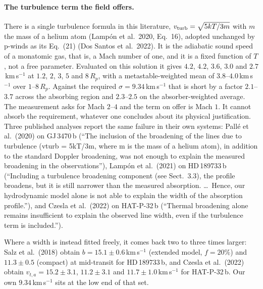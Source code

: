 \documentclass[english,a4paper]{my_memo}
\begin{document}
\paragraph{The turbulence term the field offers.}
There is a single turbulence formula in this literature,
$v_{\rm turb} = \sqrt{5kT/3m}$ with $m$ the mass of a helium atom
(Lamp\'on et al.\ 2020, Eq.~16), adopted unchanged by p-winds as its
Eq.~(21) (Dos Santos et al.\ 2022). It is the adiabatic sound speed of a
monatomic gas, that is, a Mach number of one, and it is a fixed function of
$T$, not a free parameter. Evaluated on this solution it gives $4.2$, $4.2$,
$3.6$, $3.0$ and $2.7$\,km\,s$^{-1}$ at $1.2$, $2$, $3$, $5$ and $8\,R_p$,
with a metastable-weighted mean of $3.8$--$4.0$\,km\,s$^{-1}$ over
$1$--$8\,R_p$. Against the required $\sigma = 9.34$\,km\,s$^{-1}$ that is
short by a factor $2.1$--$3.7$ across the absorbing region and $2.3$--$2.5$
on the absorber-weighted average. The measurement asks for Mach $2$--$4$ and
the term on offer is Mach $1$. It cannot absorb the requirement, whatever one
concludes about its physical justification. Three published analyses report
the same failure in their own systems: Pall\'e et al.\ (2020) on GJ\,3470\,b
(``The inclusion of the broadening of the lines due to turbulence (vturb =
5kT/3m, where m is the mass of a helium atom), in addition to the standard
Doppler broadening, was not enough to explain the measured broadening in the
observations''), Lamp\'on et al.\ (2021) on HD\,189733\,b (``Including a
turbulence broadening component (see Sect.~3.3), the profile broadens, but it
is still narrower than the measured absorption. \ldots\ Hence, our
hydrodynamic model alone is not able to explain the width of the absorption
profile.''), and Czesla et al.\ (2022) on HAT-P-32\,b (``Thermal broadening
alone remains insufficient to explain the observed line width, even if the
turbulence term is included.'').

Where a width is instead fitted freely, it comes back two to three times
larger: Salz et al.\ (2018) obtain $b = 15.1 \pm 0.6$\,km\,s$^{-1}$ (extended
model, $f = 20\%$) and $11.3 \pm 0.5$ (compact) at mid-transit for
HD\,189733\,b, and Czesla et al.\ (2022) obtain $v_{t,a} = 15.2 \pm 3.1$,
$11.2 \pm 3.1$ and $11.7 \pm 1.0$\,km\,s$^{-1}$ for HAT-P-32\,b. Our own
$9.34$\,km\,s$^{-1}$ sits at the low end of that set.
\end{document}
